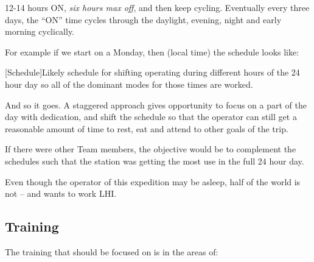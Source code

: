 \documentclass[11pt]{article}
\begin{document}
\par
12-14 hours ON, {\textit{six hours max off}}, and then keep cycling.
Eventually every three days, the ``ON'' time cycles through the
daylight, evening, night and early morning cyclically.
\par
For example if we start on a Monday, then (local time) the schedule looks
like:
\vskip2mm
\noindent%
\begin{minipage}{\linewidth}%
\captionsetup{width=0.8\linewidth}
[Schedule]{Likely schedule for shifting operating during
different hours of the 24 hour day so all of the
dominant modes for those times are worked.}
\label{sked}
\end{minipage}
\vskip3mm

And so it goes. A staggered approach gives opportunity to focus on
a part of the day with dedication, and shift the schedule so that
the operator can still get a reasonable amount of time to rest, eat
and attend to other goals of the trip.
\par
If there were other Team members, the objective would be to complement
the schedules such that the station was getting the most use in the full
24 hour day.
\par
Even though the operator of this expedition may be asleep, half of the world
is not -- and wants to work LHI.

\subsection{Training}

The training that should be focused on is in the areas of:
\end{document}
